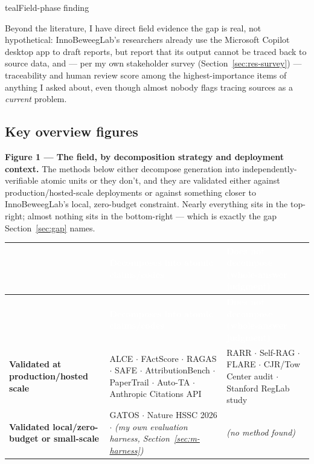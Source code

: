\begin{calloutbox}{teal}{Field-phase finding}

Beyond the literature, I have direct field evidence the gap is real, not hypothetical: InnoBeweegLab's researchers already use the Microsoft Copilot desktop app to draft reports, but report that its output cannot be traced back to source data, and — per my own stakeholder survey (Section~\ref{sec:res-survey}) — traceability and human review score among the highest-importance items of anything I asked about, even though almost nobody flags tracing sources as a \textit{current} problem.

\end{calloutbox}

\subsection{Key overview figures}\label{sec:figures}

\textbf{Figure 1 — The field, by decomposition strategy and deployment context.} The methods below either decompose generation into independently-verifiable atomic units or they don't, and they are validated either against production/hosted-scale deployments or against something closer to InnoBeweegLab's local, zero-budget constraint. Nearly everything sits in the top-right; almost nothing sits in the bottom-right — which is exactly the gap Section~\ref{sec:gap} names.



\begingroup\renewcommand{\arraystretch}{1.3}
\begin{longtable}{|>{\raggedright\arraybackslash}p{3.4cm}|>{\raggedright\arraybackslash}p{5.5cm}|>{\raggedright\arraybackslash}p{5.5cm}|}
\hline
\cellcolor{navy}\textcolor{white}{\textbf{}} & \cellcolor{navy}\textcolor{white}{\textbf{Decomposes into atomic claims/codes}} & \cellcolor{navy}\textcolor{white}{\textbf{Does not decompose (whole-answer judgment)}} \\ \hline
\endfirsthead
\hline
\cellcolor{navy}\textcolor{white}{\textbf{}} & \cellcolor{navy}\textcolor{white}{\textbf{Decomposes into atomic claims/codes}} & \cellcolor{navy}\textcolor{white}{\textbf{Does not decompose (whole-answer judgment)}} \\ \hline
\endhead
\textbf{Validated at production/hosted scale} & ALCE $\cdot$ FActScore $\cdot$ RAGAS $\cdot$ SAFE $\cdot$ AttributionBench $\cdot$ PaperTrail $\cdot$ Auto-TA $\cdot$ Anthropic Citations API & RARR $\cdot$ Self-RAG $\cdot$ FLARE $\cdot$ CJR/Tow Center audit $\cdot$ Stanford RegLab study \\ \hline
\rowcolor{light}
\textbf{Validated local/zero-budget or small-scale} & GATOS $\cdot$ Nature HSSC 2026 $\cdot$ \textit{(my own evaluation harness, Section~\ref{sec:m-harness})} & \textit{(no method found)} \\ \hline
\end{longtable}
\endgroup

